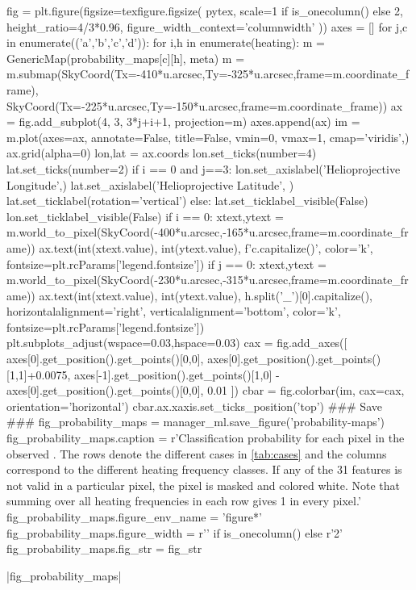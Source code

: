 \begin{pycode}[manager_ml]
fig = plt.figure(figsize=texfigure.figsize(
    pytex,
    scale=1 if is_onecolumn() else 2,
    height_ratio=4/3*0.96,
    figure_width_context='columnwidth'
))
axes = []
for j,c in enumerate(('a','b','c','d')):
    for i,h in enumerate(heating):
        m = GenericMap(probability_maps[c][h], meta)
        m = m.submap(SkyCoord(Tx=-410*u.arcsec,Ty=-325*u.arcsec,frame=m.coordinate_frame),
                     SkyCoord(Tx=-225*u.arcsec,Ty=-150*u.arcsec,frame=m.coordinate_frame))
        ax = fig.add_subplot(4, 3, 3*j+i+1, projection=m)
        axes.append(ax)
        im = m.plot(axes=ax, annotate=False, title=False, vmin=0, vmax=1, cmap='viridis',)
        ax.grid(alpha=0)
        lon,lat = ax.coords
        lon.set_ticks(number=4)
        lat.set_ticks(number=2)
        if i == 0 and j==3:
            lon.set_axislabel('Helioprojective Longitude',)
            lat.set_axislabel('Helioprojective Latitude', )
            lat.set_ticklabel(rotation='vertical')
        else:
            lat.set_ticklabel_visible(False)
            lon.set_ticklabel_visible(False)
        if i == 0:
            xtext,ytext = m.world_to_pixel(SkyCoord(-400*u.arcsec,-165*u.arcsec,frame=m.coordinate_frame))
            ax.text(int(xtext.value), int(ytext.value), f'{c.capitalize()}', color='k', fontsize=plt.rcParams['legend.fontsize'])
        if j == 0:
            xtext,ytext = m.world_to_pixel(SkyCoord(-230*u.arcsec,-315*u.arcsec,frame=m.coordinate_frame))
            ax.text(int(xtext.value), int(ytext.value),
                    h.split('_')[0].capitalize(),
                    horizontalalignment='right',
                    verticalalignment='bottom',
                    color='k', fontsize=plt.rcParams['legend.fontsize'])
plt.subplots_adjust(wspace=0.03,hspace=0.03)
cax = fig.add_axes([
    axes[0].get_position().get_points()[0,0],
    axes[0].get_position().get_points()[1,1]+0.0075,
    axes[-1].get_position().get_points()[1,0] - axes[0].get_position().get_points()[0,0],
    0.01
])
cbar = fig.colorbar(im, cax=cax, orientation='horizontal')
cbar.ax.xaxis.set_ticks_position('top')
### Save ###
fig_probability_maps = manager_ml.save_figure('probability-maps')
fig_probability_maps.caption = r'Classification probability for each pixel in the observed \AR{}. The rows denote the different cases in \autoref{tab:cases} and the columns correspond to the different heating frequency classes. If any of the 31 features is not valid in a particular pixel, the pixel is masked and colored white. Note that summing over all heating frequencies in each row gives 1 in every pixel.'
fig_probability_maps.figure_env_name = 'figure*'
fig_probability_maps.figure_width = r'\columnwidth' if is_onecolumn() else r'2\columnwidth'
fig_probability_maps.fig_str = fig_str
\end{pycode}
\py[manager_ml]|fig_probability_maps|

